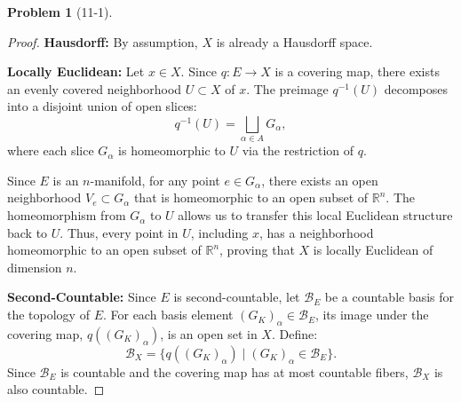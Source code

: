 \documentclass[11pt, a4paper]{article}
\theoremstyle{definition}
\newtheorem{prob}{Problem}
\newenvironment{problem}[1][]{\begin{prob}[#1]\normalfont}{\end{prob}\vspace{1.5em}}
\begin{document}
\begin{problem}[11-1]
\begin{enumerate}[(a)]
\begin{proof}
        \item[$1^\circ$] \textbf{Hausdorff:} 
        By assumption, $X$ is already a Hausdorff space.

        \item[$2^\circ$] \textbf{Locally Euclidean:} 
        Let $x \in X$. Since $q: E \to X$ is a covering map, there exists an evenly covered neighborhood $U \subset X$ of $x$. The preimage $q^{-1}(U)$ decomposes into a disjoint union of open slices:
        \[
        q^{-1}(U) = \bigsqcup_{\alpha \in A} G_\alpha,
        \]
        where each slice $G_\alpha$ is homeomorphic to $U$ via the restriction of $q$. 

        Since $E$ is an $n$-manifold, for any point $e \in G_\alpha$, there exists an open neighborhood $V_e \subset G_\alpha$ that is homeomorphic to an open subset of $\mathbb{R}^n$. The homeomorphism from $G_\alpha$ to $U$ allows us to transfer this local Euclidean structure back to $U$. Thus, every point in $U$, including $x$, has a neighborhood homeomorphic to an open subset of $\mathbb{R}^n$, proving that $X$ is locally Euclidean of dimension $n$.

        \item[$3^\circ$] \textbf{Second-Countable:} 
        Since $E$ is second-countable, let $\mathcal{B}_E$ be a countable basis for the topology of $E$. For each basis element $(G_K)_\alpha \in \mathcal{B}_E$, its image under the covering map, $q((G_K)_\alpha)$, is an open set in $X$. Define:
        \[
        \mathcal{B}_X = \{ q((G_K)_\alpha) \mid (G_K)_\alpha \in \mathcal{B}_E \}.
        \]
        Since $\mathcal{B}_E$ is countable and the covering map has at most countable fibers, $\mathcal{B}_X$ is also countable.

    \end{proof}


\end{enumerate}
\end{problem}


\end{document}
